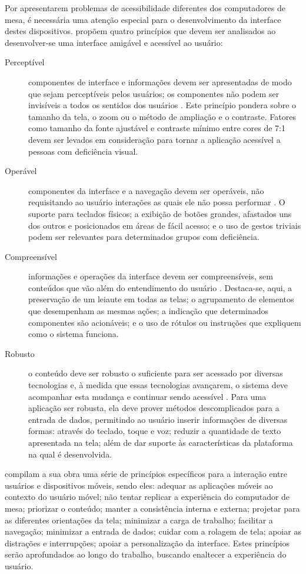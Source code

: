 Por apresentarem problemas de acessibilidade diferentes dos computadores de mesa, é necessária uma atenção especial para o desenvolvimento da interface destes dispositivos. \cite{WCAG20} propõem quatro princípios que devem ser analisados ao desenvolver-se uma interface amigável e acessível ao usuário:
\begin{description}
    \item [Perceptível] componentes de interface e informações devem ser apresentadas de modo que sejam perceptíveis pelos usuários; os componentes não podem ser invisíveis a todos os sentidos dos usuários \cite{W3C20}. Este princípio pondera sobre o tamanho da tela, o zoom ou o método de ampliação e o contraste. Fatores como tamanho da fonte ajustável e contraste mínimo entre cores de 7:1 devem ser levados em consideração para tornar a aplicação acessível a pessoas com deficiência visual.
    \item [Operável] componentes da interface e a navegação devem ser operáveis, não requisitando ao usuário interações as quais ele não possa performar \cite{W3C20}. O suporte para teclados físicos; a exibição de botões grandes, afastados uns dos outros e posicionados em áreas de fácil acesso; e o uso de gestos triviais podem ser relevantes para determinados grupos com deficiência.
    \item [Compreensível] informações e operações da interface devem ser compreensíveis, sem conteúdos que vão além do entendimento do usuário \cite{W3C20}. Destaca-se, aqui, a preservação de um leiaute em todas as telas; o agrupamento de elementos que desempenham as mesmas ações; a indicação que determinados componentes são acionáveis; e o uso de rótulos ou instruções que expliquem como o sistema funciona.
    \item [Robusto] o conteúdo deve ser robusto o suficiente para ser acessado por diversas tecnologias e, à medida que essas tecnologias avançarem, o sistema deve acompanhar esta mudança e continuar sendo acessível \cite{W3C20}. Para uma aplicação ser robusta, ela deve prover métodos descomplicados para a entrada de dados, permitindo ao usuário inserir informações de diversas formas: através do teclado, toque e voz; reduzir a quantidade de texto apresentada na tela; além de dar suporte às características da plataforma na qual é desenvolvida.
\end{description}

\cite{ERGO2015} compilam a sua obra uma série de princípios específicos para a interação entre usuários e dispositivos móveis, sendo eles: adequar as aplicações móveis ao contexto do usuário móvel; não tentar replicar a experiência do computador de mesa; priorizar o conteúdo; manter a consistência interna e externa; projetar para as diferentes orientações da tela; minimizar a carga de trabalho; facilitar a navegação; minimizar a entrada de dados; cuidar com a rolagem de tela; apoiar as distrações e interrupções; apoiar a personalização da interface. Estes princípios serão aprofundados ao longo do trabalho, buscando enaltecer a experiência do usuário.

